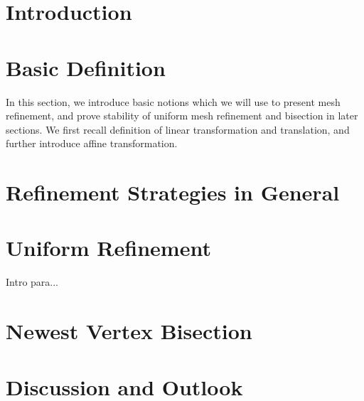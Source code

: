 \documentclass[english]{article}
\begin{document}
  

  \section{Introduction}
  

  \section{Basic Definition}
    In this section, we introduce basic notions which we will use to present mesh refinement, and prove stability of uniform mesh refinement and bisection in later sections.
    We first recall definition of linear transformation and translation, and further introduce affine transformation.

    
    
    
    


  \section{Refinement Strategies in General}
    

  \section{Uniform Refinement}
  Intro para...
    

  \section{Newest Vertex Bisection}
    

  \section{Discussion and Outlook}
    

  \newpage
  
  
    
\end{document}
